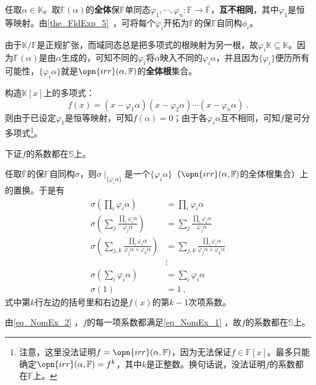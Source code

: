 任取$\alpha\in\mathbb{K}$。取$\mathbb{F}(\alpha)$的\textbf{全体}保$\mathbb{F}$单同态$\varphi_1, \cdots, \varphi_n:\mathbb{F}\to\overline{\mathbb{F}}$，\textbf{互不相同}，其中$\varphi_1$是恒等映射。由\autoref{the_FldExp_5}~，可将每个$\varphi_i$开拓为$\overline{\mathbb{F}}$的保$\mathbb{F}$自同构$\phi_i$。

由于$\mathbb{K}/\mathbb{F}$是正规扩张，而域同态总是把多项式的根映射为另一根，故$\varphi_i\mathbb{K}\subseteq\mathbb{K}$。因为$\mathbb{F}(\alpha)$是由$\alpha$生成的，可知不同的$\varphi_i$将$\alpha$映入不同的$\varphi_i\alpha$，并且因为$\{\varphi_i\}$便历所有可能性，$\{\varphi_i\alpha\}$就是$\opn{irr}(\alpha, \mathbb{F})$的\textbf{全体根}集合。

构造$\mathbb{K}[x]$上的多项式：
\begin{equation}
f(x) = (x-\varphi_1\alpha)(x-\varphi_2\alpha)\cdots(x-\varphi_n\alpha)~.
\end{equation}
则由于已设定$\varphi_1$是恒等映射，可知$f(\alpha)=0$；由于各$\varphi_i\alpha$互不相同，可知$f$是可分多项式\footnote{注意，这里没法证明$f=\opn{irr}(\alpha, \mathbb{F})$，因为无法保证$f\in\mathbb{F}[x]$。最多只能确定$\opn{irr}(\alpha, \mathbb{F})=f^k$，其中$k$是正整数。换句话说，没法证明$f$的系数都在$\mathbb{F}$上。}。

下证$f$的系数都在$\mathbb{S}$上。

任取$\overline{\mathbb{F}}$的保$\mathbb{F}$自同构$\sigma$，则$\sigma\mid_{\{\varphi_i\alpha\}}$是一个$\{\varphi_i\alpha\}$（$\opn{irr}(\alpha, \mathbb{F})$的全体根集合）上的置换。于是有
\begin{equation}\label{eq_NomEx_2}
\begin{aligned}
\sigma(\prod_i \varphi_i\alpha) &= \prod_i \varphi_i\alpha\\
\sigma(\sum_{j}\frac{\prod_i \varphi_i\alpha}{\varphi_j\alpha}) &= \sum_{j}\frac{\prod_i \varphi_i\alpha}{\varphi_j\alpha}\\
\sigma(\sum_{j, k}\frac{\prod_i \varphi_i\alpha}{\varphi_j\alpha\times\varphi_k\alpha}) &= \sum_{j, k}\frac{\prod_i \varphi_i\alpha}{\varphi_j\alpha\times\varphi_k\alpha}\\
&\vdots\\
\sigma(\sum_i\varphi_i\alpha) &= \sum_i\varphi_i\alpha\\
\sigma(1) &= 1~,
\end{aligned}
\end{equation}
式中第$k$行左边的括号里和右边是$f(x)$的第$k-1$次项系数。

由\autoref{eq_NomEx_2} ，$f$的每一项系数都满足\autoref{eq_NomEx_1} ，故$f$的系数都在$\mathbb{S}$上。

